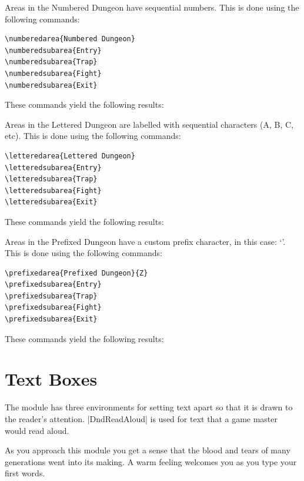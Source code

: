 \documentclass[letterpaper,twocolumn,openany]{dndarticle}
\begin{document}
Areas in the Numbered Dungeon have sequential numbers. This is done using
the following commands:

\begin{verbatim}
\numberedarea{Numbered Dungeon}
\numberedsubarea{Entry}
\numberedsubarea{Trap}
\numberedsubarea{Fight}
\numberedsubarea{Exit}
\end{verbatim}

These commands yield the following results:

Areas in the Lettered Dungeon are labelled with sequential characters
(A, B, C, etc). This is done using the following commands:

\begin{verbatim}
\letteredarea{Lettered Dungeon}
\letteredsubarea{Entry}
\letteredsubarea{Trap}
\letteredsubarea{Fight}
\letteredsubarea{Exit}
\end{verbatim}

These commands yield the following results:

Areas in the Prefixed Dungeon have a custom prefix character,
in this case: `\prefixedareaprefix'.
This is done using the following commands:

\begin{verbatim}
\prefixedarea{Prefixed Dungeon}{Z}
\prefixedsubarea{Entry}
\prefixedsubarea{Trap}
\prefixedsubarea{Fight}
\prefixedsubarea{Exit}
\end{verbatim}

These commands yield the following results:

\section{Text Boxes}

The module has three environments for setting text apart so that it is drawn to the reader's attention. |DndReadAloud| is used for text that a game master would read aloud.

\begin{DndReadAloud}
  As you approach this module you get a sense that the blood and tears of many generations went into its making. A warm feeling welcomes you as you type your first words.
\end{DndReadAloud}
\end{document}
